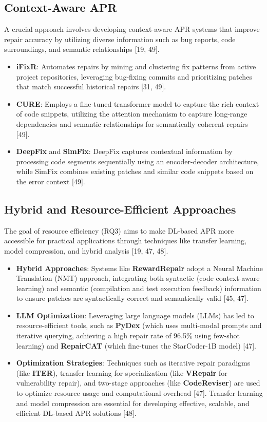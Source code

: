 \subsection{Context-Aware APR}
A crucial approach involves developing context-aware APR systems that improve repair accuracy by utilizing diverse information such as bug reports, code surroundings, and semantic relationships [19, 49].
\begin{itemize}
    \item \textbf{iFixR}: Automates repairs by mining and clustering fix patterns from active project repositories, leveraging bug-fixing commits and prioritizing patches that match successful historical repairs [31, 49].
    \item \textbf{CURE}: Employs a fine-tuned transformer model to capture the rich context of code snippets, utilizing the attention mechanism to capture long-range dependencies and semantic relationships for semantically coherent repairs [49].
    \item \textbf{DeepFix} and \textbf{SimFix}: DeepFix captures contextual information by processing code segments sequentially using an encoder-decoder architecture, while SimFix combines existing patches and similar code snippets based on the error context [49].
\end{itemize}

\subsection{Hybrid and Resource-Efficient Approaches}
The goal of resource efficiency (RQ3) aims to make DL-based APR more accessible for practical applications through techniques like transfer learning, model compression, and hybrid analysis [19, 47, 48].

\begin{itemize}
    \item \textbf{Hybrid Approaches}: Systems like \textbf{RewardRepair} adopt a Neural Machine Translation (NMT) approach, integrating both syntactic (code context-aware learning) and semantic (compilation and test execution feedback) information to ensure patches are syntactically correct and semantically valid [45, 47].
    \item \textbf{LLM Optimization}: Leveraging large language models (LLMs) has led to resource-efficient tools, such as \textbf{PyDex} (which uses multi-modal prompts and iterative querying, achieving a high repair rate of 96.5\% using few-shot learning) and \textbf{RepairCAT} (which fine-tunes the StarCoder-1B model) [47].
    \item \textbf{Optimization Strategies}: Techniques such as iterative repair paradigms (like \textbf{ITER}), transfer learning for specialization (like \textbf{VRepair} for vulnerability repair), and two-stage approaches (like \textbf{CodeReviser}) are used to optimize resource usage and computational overhead [47]. Transfer learning and model compression are essential for developing effective, scalable, and efficient DL-based APR solutions [48].
\end{itemize}